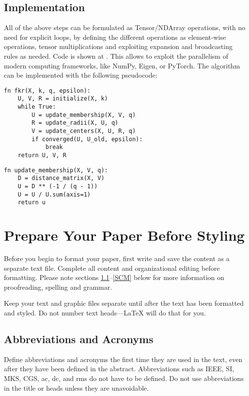 \documentclass[conference]{IEEEtran}
\begin{document}
\subsection{Implementation}
All of the above steps can be formulated as Tensor/NDArray operations, with no need for explicit loops,
by defining the different operations as element-wise operations, tensor multiplications and exploiting
expansion and broadcasting rules as needed. Code is shown at \cite{b1}.
This allows to exploit the parallelism of modern computing frameworks, like NumPy, Eigen, or PyTorch.
The algorithm can be implemented with the following pseudocode:
\begin{verbatim}
fn fkr(X, k, q, epsilon):
    U, V, R = initialize(X, k)
    while True:
        U = update_membership(X, V, q)
        R = update_radii(X, U, q)
        V = update_centers(X, U, R, q)
        if converged(U, U_old, epsilon):
            break
    return U, V, R
\end{verbatim}
\begin{verbatim}
fn update_membership(X, V, q):
    D = distance_matrix(X, V)
    U = D ** (-1 / (q - 1))
    U = U / U.sum(axis=1)
    return u
\end{verbatim}

\section{Prepare Your Paper Before Styling}
Before you begin to format your paper, first write and save the content as a 
separate text file. Complete all content and organizational editing before 
formatting. Please note sections \ref{AA}--\ref{SCM} below for more information on 
proofreading, spelling and grammar.

Keep your text and graphic files separate until after the text has been 
formatted and styled. Do not number text heads---{\LaTeX} will do that 
for you.

\subsection{Abbreviations and Acronyms}\label{AA}
Define abbreviations and acronyms the first time they are used in the text, 
even after they have been defined in the abstract. Abbreviations such as 
IEEE, SI, MKS, CGS, ac, dc, and rms do not have to be defined. Do not use 
abbreviations in the title or heads unless they are unavoidable.
\end{document}
